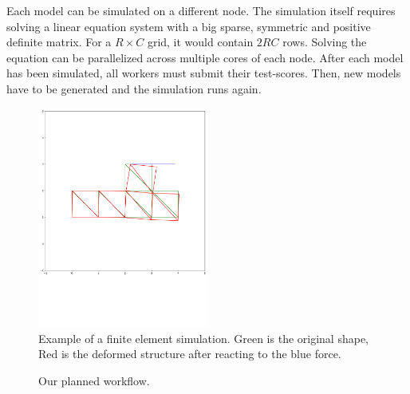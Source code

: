 \documentclass[12pt]{article}
\begin{document}
Each model can be simulated on a different node. The simulation itself requires solving a linear equation system with a big sparse, symmetric and positive definite matrix. For a $R \times C$ grid, it would contain ${2RC}$ rows. Solving the equation can be parallelized across multiple cores of each node. After each model has been simulated, all workers must submit their test-scores. Then, new models have to be generated and the simulation runs again.





\begin{figure}[p]
    \centering
    \includegraphics[width=0.5\textwidth, trim={0cm 6.5cm 0cm 0cm}, clip]{images/finiteElements.pdf}
    \caption{Example of a finite element simulation. Green is the original shape, Red is the deformed structure after reacting to the blue force.}
    \label{fig:finiteElements}
\end{figure}

\begin{figure}[p]
    \centering
    \caption{Our planned workflow.}
    \label{fig:finiteElements}
\end{figure}
\end{document}
